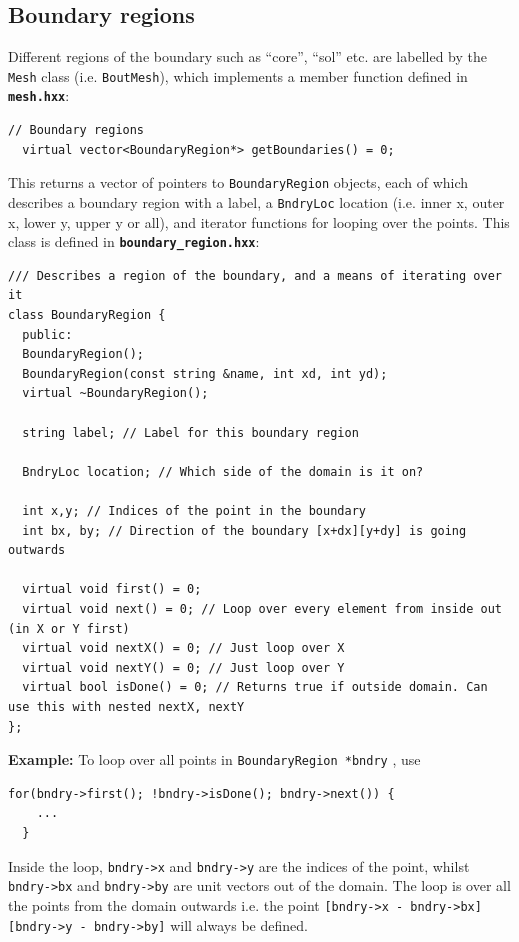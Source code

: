 \documentclass[12pt]{article}
\newcommand{\code}[1]{\texttt{#1}}
\newcommand{\file}[1]{\texttt{\bf #1}}
\begin{document}
\subsection{Boundary regions}
%
\label{sec:BoundaryRegion}
%
Different regions of the boundary such as ``core'', ``sol'' etc. are labelled
by the \code{Mesh} class (i.e. \code{BoutMesh}), which implements a member
function defined in \file{mesh.hxx}:
%
\begin{lstlisting}[firstnumber=150]
  // Boundary regions
  virtual vector<BoundaryRegion*> getBoundaries() = 0;
\end{lstlisting}
%
This returns a vector of pointers to \code{BoundaryRegion} objects, each of
which describes a boundary region with a label, a \code{BndryLoc} location
(i.e. inner x, outer x, lower y, upper y or all), and iterator functions for
looping over the points. This class is defined in \file{boundary\_region.hxx}:
%
%
\begin{lstlisting}[firstnumber=12]
/// Describes a region of the boundary, and a means of iterating over it
class BoundaryRegion {
  public:
  BoundaryRegion();
  BoundaryRegion(const string &name, int xd, int yd);
  virtual ~BoundaryRegion();

  string label; // Label for this boundary region

  BndryLoc location; // Which side of the domain is it on?

  int x,y; // Indices of the point in the boundary
  int bx, by; // Direction of the boundary [x+dx][y+dy] is going outwards

  virtual void first() = 0;
  virtual void next() = 0; // Loop over every element from inside out (in X or Y first)
  virtual void nextX() = 0; // Just loop over X
  virtual void nextY() = 0; // Just loop over Y
  virtual bool isDone() = 0; // Returns true if outside domain. Can use this with nested nextX, nextY
};
\end{lstlisting}
%
{\bf Example:} To loop over all points in \code{BoundaryRegion *bndry} , use
%
\begin{lstlisting}[numbers=none]
  for(bndry->first(); !bndry->isDone(); bndry->next()) {
    ...
  }
\end{lstlisting}
%
Inside the loop, \code{bndry->x} and \code{bndry->y} are the indices of the
point, whilst \code{bndry->bx} and \code{bndry->by} are unit vectors out of the
domain. The loop is over all the points from the domain outwards i.e. the point
\code{[bndry->x - bndry->bx][bndry->y - bndry->by]} will always be defined.
\end{document}
